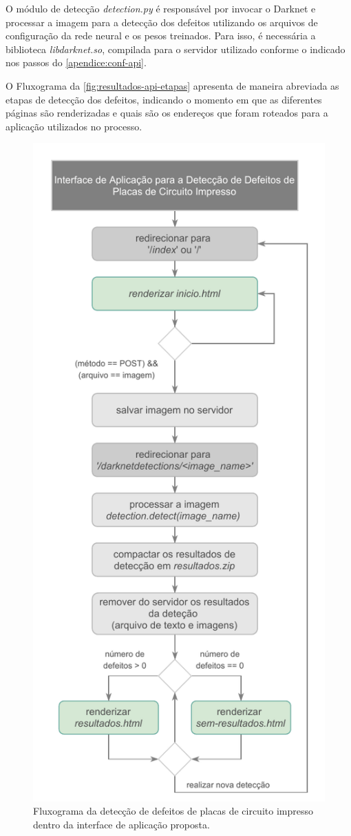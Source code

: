O módulo de detecção \textit{detection.py} é responsável por invocar o Darknet e processar a imagem para a detecção dos defeitos utilizando os arquivos de configuração da rede neural e os pesos treinados.
Para isso, é necessária a biblioteca \textit{libdarknet.so}, compilada para o servidor utilizado conforme o indicado nos passos do
\autoref{apendice:conf-api}.

O Fluxograma da \autoref{fig:resultados-api-etapas} apresenta de maneira abreviada as etapas de detecção dos defeitos, indicando o momento em que as diferentes páginas são renderizadas e quais são os endereços que foram roteados para a aplicação utilizados no processo.

\begin{figure}[H] %
  \centering
  \caption{Fluxograma da detecção de defeitos de placas de circuito impresso dentro da interface de aplicação proposta.}
  \includegraphics[scale=1.03]{img/img-resultados-api-fluxograma.pdf}

\end{figure}
